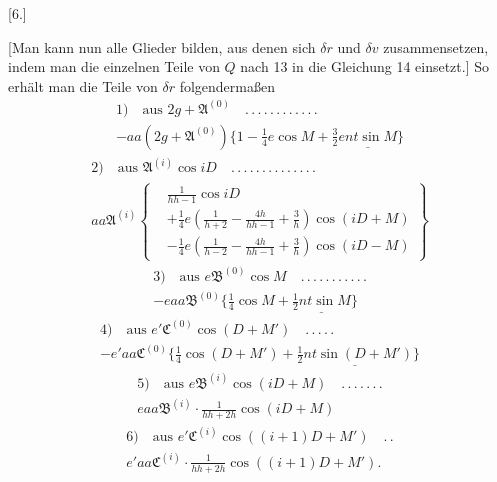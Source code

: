 \par\bigskip
\hypertarget{native-395}{}
\begin{center}[6.]\end{center}
\noindent\hspace*{\parindent}[Man kann nun alle Glieder bilden, aus denen sich \(\delta r\) und \(\delta v\) zusammensetzen, indem man die einzelnen Teile von \(Q\) nach 13 in die Gleichung 14 einsetzt.] So erhält man die Teile von \(\delta r\) folgendermaßen
\[
\begin{gathered}
1)\quad\text{aus }2g+\mathfrak A^{(0)}\quad .\, .\, .\, .\, .\, .\, .\, .\, .\, .\, .\, .\\[.5ex]
-aa(2g+\mathfrak A^{(0)})\{1-\tfrac14e\cos M+\underline{\tfrac32ent\sin M\}}
\end{gathered}
\]
\[
\begin{gathered}
2)\quad\text{aus }\mathfrak A^{(i)}\cos iD\quad .\, .\, .\, .\, .\, .\, .\, .\, .\, .\, .\, .\, .\, .\\[.5ex]
aa\mathfrak A^{(i)}\left\{\begin{aligned}
&\frac1{hh-1}\cos iD\\
&+\tfrac14e\left(\frac1{h+2}-\frac{4h}{hh-1}+\frac3h\right)\cos(iD+M)\\
&-\tfrac14e\left(\frac1{h-2}-\frac{4h}{hh-1}+\frac3h\right)\cos(iD-M)
\end{aligned}\right\}
\end{gathered}
\]
\[
\begin{gathered}
3)\quad\text{aus }e\mathfrak B^{(0)}\cos M\quad .\, .\, .\, .\, .\, .\, .\, .\, .\, .\, .\\[.5ex]
-eaa\mathfrak B^{(0)}\{\tfrac14\cos M+\underline{\tfrac12nt\sin M}\}
\end{gathered}
\]
\[
\begin{gathered}
4)\quad\text{aus }e'\mathfrak C^{(0)}\cos(D+M')\quad .\, .\, .\, .\, .\\[.5ex]
-e'aa\mathfrak C^{(0)}\{\tfrac14\cos(D+M')+\underline{\tfrac12nt\sin(D+M')}\}
\end{gathered}
\]
\[
\begin{gathered}
5)\quad\text{aus }e\mathfrak B^{(i)}\cos(iD+M)\quad .\, .\, .\, .\, .\, .\, .\\[.5ex]
eaa\mathfrak B^{(i)}\cdot\frac1{hh+2h}\cos(iD+M)
\end{gathered}
\]
\[
\begin{gathered}
6)\quad\text{aus }e'\mathfrak C^{(i)}\cos((i+1)D+M')\quad .\, .\\[.5ex]
e'aa\mathfrak C^{(i)}\cdot\frac1{hh+2h}\cos((i+1)D+M').
\end{gathered}
\]

